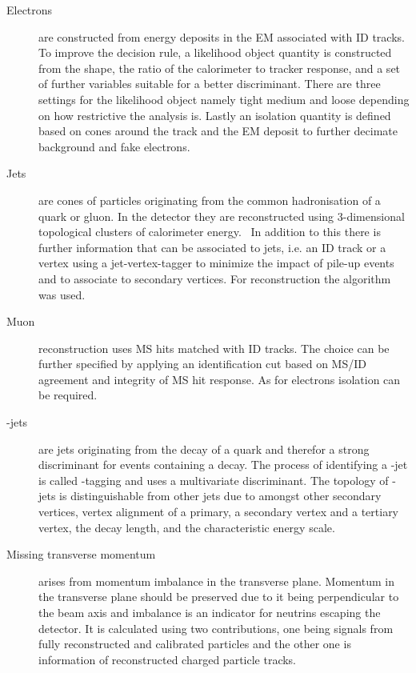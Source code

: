\begin{description}
\item[Electrons] 
are constructed from energy deposits in the EM associated with ID tracks.
To improve the decision rule, a likelihood object quantity is constructed from the shape, the ratio of the calorimeter to tracker response, and a set of further variables suitable for a better discriminant. There are three settings for the likelihood object namely tight medium and loose depending on how restrictive the analysis is.
Lastly an isolation quantity is defined based on cones around the track and the EM deposit to further decimate background and fake electrons.~\cite{ATLAS-CONF-2016-024}
\item[Jets] are cones of particles originating from the common hadronisation of a quark or gluon. In the detector they are reconstructed using 3-dimensional topological clusters of calorimeter energy.~\cite{Aad:2016upy} In addition to this there is further information that can be associated to jets, {i.e.} an ID track or a vertex using a jet-vertex-tagger to minimize the impact of pile-up events and to associate to secondary vertices. For reconstruction the \antikt algorithm was used.~\cite{Cacciari:2008gp}
\item[Muon] reconstruction uses MS hits matched with ID tracks. The choice can be further specified by applying an identification cut based on MS/ID agreement and integrity of MS hit response. As for electrons isolation can be required.~\cite{Aad:2016jkr}
\item[\Pbottom-jets] are jets originating from the decay of a \Pbottom quark and therefor a strong discriminant for events containing a \Ptop decay. The process of identifying a \Pbottom-jet is called \Pbottom-tagging and uses a multivariate discriminant. The topology of \Pbottom-jets is distinguishable from other jets due to amongst other secondary vertices, vertex alignment of a primary, a secondary \Pbottom vertex and a tertiary \Pcharm vertex, the decay length, and the characteristic energy scale.~\cite{Aad:2110203, ATL-PHYS-PUB-2016-012}
\item[Missing transverse momentum]
arises from momentum imbalance in the transverse plane. Momentum in the transverse plane should be preserved due to it being perpendicular to the beam axis and imbalance is an indicator for neutrins escaping the detector. It is calculated using two contributions, one being signals from fully reconstructed and calibrated particles and the other one is information of reconstructed charged particle tracks. ~\cite{Aaboud:2018tkc}  
\end{description}


